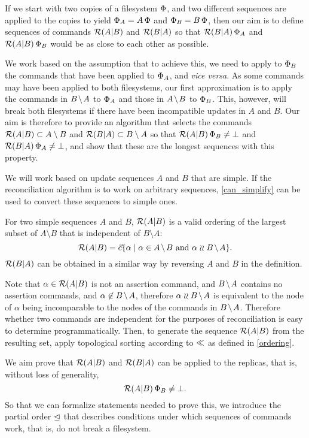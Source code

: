 
If we start with two copies of a filesystem $\Phi$,
and two different sequences are applied to the copies to yield $\Phi_A=A\,\Phi$
and $\Phi_B=B\,\Phi$, then our aim is to define sequences of commands $\mathcal{R}({A}|{B})$ and $\mathcal{R}({B}|{A})$
so that $\mathcal{R}({B}|{A})\,\Phi_A$ and $\mathcal{R}({A}|{B})\,\Phi_B$ would be as close to each other as possible.

We work based on the assumption that to achieve this, we need
to apply to $\Phi_B$ the commands that have been applied to $\Phi_A$, and \emph{vice versa}.
As some commands may have been applied to both filesystems, our first approximation
is to apply the commands in $\bmanp$ to $\Phi_A$ and those in $\ambnp$ to $\Phi_B$.
This, however, will break both filesystems if there have been incompatible updates
in $A$ and $B$. 
Our aim is therefore to provide an algorithm that selects the commands 
$\mathcal{R}({A}|{B}) \subset A\setminus B$
and $\mathcal{R}({B}|{A}) \subset B\setminus A$ 
so that $\mathcal{R}({A}|{B})\,\Phi_B\neq\bot$ and $\mathcal{R}({B}|{A})\,\Phi_A\neq\bot$,
and show that these are the longest sequences with this property.

We will work based on update sequences $A$ and $B$ that are simple.
If the reconciliation algorithm is to work on arbitrary sequences,
\cref{can_simplify} can be used to convert these sequences to simple ones.

\begin{mydef}[Reconciliation]
For two simple sequences $A$ and $B$,
$\mathcal{R}({A}|{B})$ is a valid ordering of
the largest subset of $A\setminus B$
that is independent of $B\setminus A$:
\[ \reca = \ords{\alpha \whr \alpha\in \ambnp  \mbox{~and~}  \alpha\indep \bmanp }. \]
$\mathcal{R}({B}|{A})$ can be obtained in a similar way by reversing $A$ and $B$
in the definition.
\end{mydef}

Note that $\alpha\in\mathcal{R}({A}|{B})$ is not an assertion command, and $\bmanp$ contains no assertion commands,
and $\alpha\not\in\bmanp$, therefore $\alpha\indep\bmanp$ is equivalent to
the node of $\alpha$ being incomparable to the nodes of the commands in $\bmanp$.
Therefore whether two commands are independent 
for the purposes of reconciliation
is easy to determine programmatically.
Then, to generate the sequence $\mathcal{R}({A}|{B})$ from the resulting set, 
apply topological sorting according to $\ll$ as defined in \cref{ordering}.


\myskip
We aim prove that $\mathcal{R}({A}|{B})$ and $\mathcal{R}({B}|{A})$ can be applied to the replicas,
that is, without loss of generality,
\[ \mathcal{R}({A}|{B})\,\Phi_B\neq\bot. \]
So that we can formalize statements needed to prove this,
we introduce the partial order $\trianglelefteq$ that describes conditions under which
sequences of commands work, that is, do not break a filesystem.
